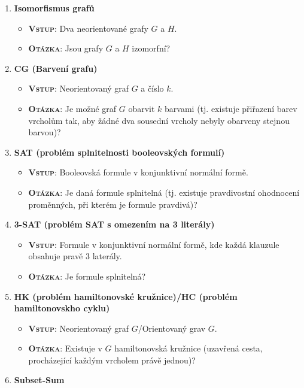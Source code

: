 \begin{enumerate}
\begin{itemize}
	\end{itemize}
	\item \textbf{Isomorfismus grafů}
	\begin{itemize}
		\item \textbf{\textsc{Vstup}}: Dva neorientované grafy $ G $ a $ H $.
		\item \textbf{\textsc{Otázka}}: Jsou grafy $ G $ a $ H $ izomorfní?
	\end{itemize}
	\item \textbf{CG (Barvení grafu)}
	\begin{itemize}
		\item \textbf{\textsc{Vstup}}: Neorientovaný graf $ G $ a číslo $ k $.
		\item \textbf{\textsc{Otázka}}: Je možné graf $ G $ obarvit $ k $ barvami (tj. existuje přiřazení barev vrcholům tak, aby žádné dva sousední vrcholy nebyly obarveny stejnou barvou)?
	\end{itemize}
	\item \textbf{SAT (problém splnitelnosti booleovských formulí)}
	\begin{itemize}
		\item \textbf{\textsc{Vstup}}: Booleovská formule v konjunktivní normální formě.
		\item \textbf{\textsc{Otázka}}: Je daná formule splnitelná (tj. existuje pravdivostní ohodnocení proměnných, při kterém je formule pravdivá)?
	\end{itemize}
	\item \textbf{3-SAT (problém SAT s omezením na 3 literály)}
	\begin{itemize}
		\item \textbf{\textsc{Vstup}}: Formule v konjunktivní normální formě, kde každá klauzule obsahuje pravě 3 laterály.
		\item \textbf{\textsc{Otázka}}: Je formule splnitelná?
	\end{itemize}
	\item \textbf{HK (problém hamiltonovské kružnice)/HC (problém hamiltonovskho cyklu) }
	\begin{itemize}
		\item \textbf{\textsc{Vstup}}: Neorientovaný graf $ G $/Orientovaný grav $ G $.
		\item \textbf{\textsc{Otázka}}: Existuje v $ G $ hamiltonovská kružnice (uzavřená cesta, procházející každým vrcholem právě jednou)?
	\end{itemize}
	\item \textbf{Subset-Sum}
	\begin{itemize}

\end{itemize}
\end{enumerate}

